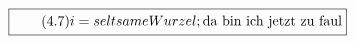 \documentclass[11pt]{article}
\newcommand{\1}{ {\mathds{1}} }
\begin{document}
\begin{multicols}{2}
		\begin{equation}
			\boxed{
				\tag{4.7}
				\begin{split}
					i = seltsame Wurzel; 
					\text{da bin ich jetzt zu faul}
				\end{split}
			}
		\end{equation}

%
%		
%
%
%
%

\end{multicols}
\end{document}
